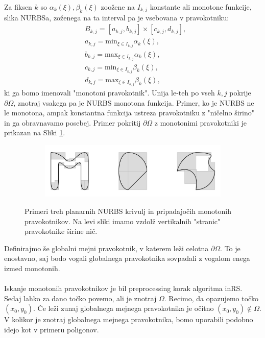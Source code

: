 \documentclass{article}
\begin{document}
Za fiksen $k$ so $\alpha_k(\xi), \beta_k(\xi)$ zoožene na $I_{k,j}$ konstante ali monotone funkcije, slika NURBSa, zoženega na ta interval pa je vsebovana v pravokotniku:
\begin{align}
&B_{k,j} = [a_{k,j}, b_{k,j}] \times [c_{k,j}, d_{k,j}], \\
& a_{k,j} = \mathrm{min}_{\xi \in I_{k,j}} \alpha_k(\xi), \\
& b_{k,j} = \mathrm{max}_{\xi \in I_{k,j}} \alpha_k(\xi), \\
& c_{k,j} = \mathrm{min}_{\xi \in I_{k,j}} \beta_k(\xi), \\
& d_{k,j} = \mathrm{max}_{\xi \in I_{k,j}} \beta_k(\xi), 
\end{align}
ki ga bomo imenovali "monotoni pravokotnik".
Unija le-teh po vseh $k,j$ pokrije $\partial \Omega$, znotraj vsakega pa je NURBS monotona funkcija.
Primer, ko je NURBS ne le monotona, ampak konstantna funkcija ustreza pravokotniku z "ničelno širino" in ga obravnavamo posebej.
Primer pokritij $\partial \Omega$ z monotonimi pravokotniki je prikazan na Sliki \ref{fig:pokritje}.
\begin{figure}[H]
\centering
\begin{subfigure}{.8\textwidth}
\includegraphics[width=\linewidth]{Slike/inRS_pokritje.png}
\end{subfigure}
\caption{Primeri treh planarnih NURBS krivulj in pripadajočih monotonih pravokotnikov. Na levi sliki imamo vzdolž vertikalnih "stranic" pravokotnike širine nič.}
\label{fig:pokritje}
\end{figure}
Definirajmo še globalni mejni pravokotnik, v katerem leži celotna $\partial \Omega$. To je enostavno, saj bodo vogali globalnega pravokotnika sovpadali z vogalom enega izmed monotonih.
\\
\\
Iskanje monotonih pravokotnikov je bil preprocessing korak algoritma inRS. Sedaj lahko za dano točko povemo, ali je znotraj $\Omega$.
Recimo, da opazujemo točko $(x_0,y_0)$. Če leži zunaj globalnega mejnega pravokotnika je očitno $(x_0,y_0) \notin \Omega$.
V kolikor je znotraj globalnega mejnega pravokotnika, bomo uporabili podobno idejo kot v primeru poligonov.
\end{document}
